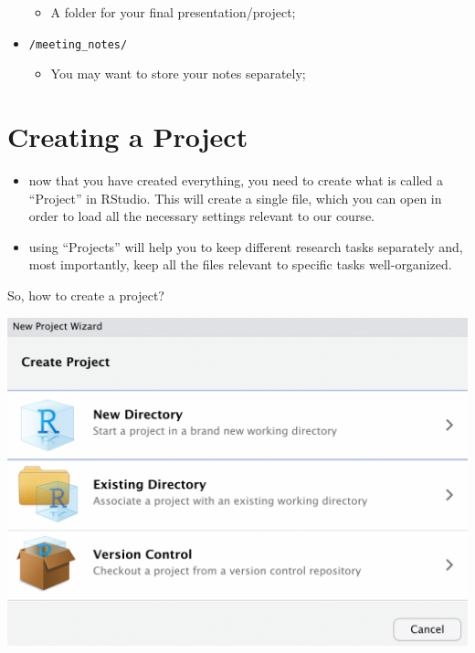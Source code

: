 \documentclass[
]{book}
\providecommand{\tightlist}{%
  \setlength{\itemsep}{0pt}\setlength{\parskip}{0pt}}
\begin{document}
\begin{itemize}
  \begin{itemize}
  \tightlist
  \item
    A folder for your final presentation/project;
  \end{itemize}
\item
  \texttt{/meeting\_notes/}

  \begin{itemize}
  \tightlist
  \item
    You may want to store your notes separately;
  \end{itemize}
\end{itemize}

\hypertarget{creating-a-project}{%
\section{Creating a Project}\label{creating-a-project}}

\begin{itemize}
\tightlist
\item
  now that you have created everything, you need to create what is called a ``Project'' in RStudio. This will create a single file, which you can open in order to load all the necessary settings relevant to our course.
\item
  using ``Projects'' will help you to keep different research tasks separately and, most importantly, keep all the files relevant to specific tasks well-organized.
\end{itemize}

So, how to create a project?

\includegraphics{./images/r_instructions/new_project.png}
\end{document}

